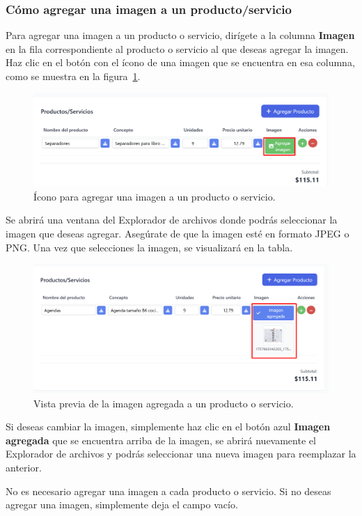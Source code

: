 \documentclass{Pretexto/bluereport}
\begin{document}
\begin{minipage}
\subsubsection{Cómo agregar una imagen a un producto/servicio}
Para agregar una imagen a un producto o servicio, dirígete a la columna \textbf{Imagen} en la fila correspondiente al producto o servicio al 
que deseas agregar la imagen. Haz clic en el botón con el ícono de una imagen que se encuentra en esa columna, como se muestra en
 la figura~\ref{fig:icono_imagen}. 
\begin{figure}[H] 
    \centering
        \includegraphics[width=0.8\linewidth]{img/icono_imagen.png}
    \caption{Ícono para agregar una imagen a un producto o servicio.}
    \label{fig:icono_imagen}
\end{figure}
Se abrirá una ventana del Explorador de archivos donde podrás seleccionar la imagen que deseas agregar. Asegúrate de que la imagen esté en
formato JPEG o PNG. Una vez que selecciones la imagen, se visualizará en la tabla.
\begin{figure}[H] 
    \centering
        \includegraphics[width=0.8\linewidth]{img/imagen_agregada.png}
    \caption{Vista previa de la imagen agregada a un producto o servicio.}
    \label{fig:imagen_agregada}
\end{figure}
Si deseas cambiar la imagen, simplemente haz clic en el botón azul \textbf{Imagen agregada} que se encuentra arriba de la imagen, se 
abrirá nuevamente el Explorador de archivos y podrás seleccionar una nueva imagen para reemplazar la anterior.
\begin{importante}
No es necesario agregar una imagen a cada producto o servicio. Si no deseas agregar una imagen, simplemente deja el campo vacío.
\end{importante}


\end{minipage}
\end{document}
